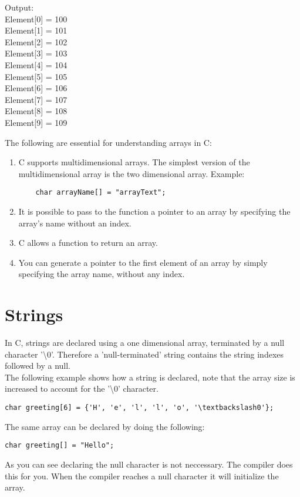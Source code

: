 \documentclass[
	12pt, %
]{fphw}
\begin{document}
\begin{problem}
	
	Output:\\
	Element[0] = 100\\
	Element[1] = 101\\
	Element[2] = 102\\
	Element[3] = 103\\
	Element[4] = 104\\
	Element[5] = 105\\
	Element[6] = 106\\
	Element[7] = 107\\
	Element[8] = 108\\
	Element[9] = 109
\end{problem}

The following are essential for understanding arrays in C:
\begin{enumerate}
	\item C supports multidimensional arrays. The simplest version of the multidimensional array is the two dimensional array. 
		Example:
		\begin{lstlisting} 
	char arrayName[] = "arrayText"; 
		\end{lstlisting}
	\item It is possible to pass to the function a pointer to an array by specifying the array's name without an index.
	\item C allows a function to return an array.
	\item You can generate a pointer to the first element of an array by simply specifying the array name, without any index.
\end{enumerate}

\newpage

\section*{Strings}
In C, strings are declared using a one dimensional array, terminated by a null 
character '\textbackslash0'. Therefore a 'null-terminated' string contains the 
string indexes followed by a null.\\

The following example shows how a string is declared, note that the array size 
is increased to account for the '\textbackslash0' character.
\begin{lstlisting}
char greeting[6] = {'H', 'e', 'l', 'l', 'o', '\textbackslash0'};
\end{lstlisting}
The same array can be declared by doing the following:
\begin{lstlisting}
char greeting[] = "Hello";
\end{lstlisting}
As you can see declaring the null character is not neccessary. The compiler does 
this for you. When the compiler reaches a null character it will initialize the array.
\end{document}
